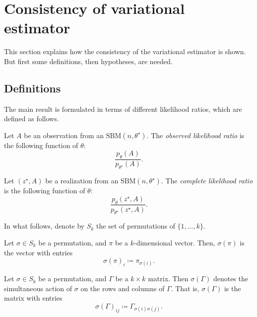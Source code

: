 \documentclass[../../main.tex]{subfiles} %
\begin{document}
\section{Consistency of variational estimator}  %
\label{sec:variational-consistency}
This section explains how the consistency of the variational estimator is shown. 
But first some definitions, then hypotheses, are needed.

\subsection{Definitions}
The main result is formulated in terms of different likelihood 
ratios, which are defined as follows.

\begin{definition}
	Let \(A\) be an observation from an \(\text{SBM}(n, \theta^\star)\). The 
	\textit{observed likelihood ratio} is the following function of \(\theta\):
	\begin{equation}
		\frac{p_\theta (A)}{p_{\theta^\star} (A)}.
	\end{equation}
\end{definition}

\begin{definition}
	Let \((z^\star, A)\) be a realization from an \(\text{SBM}(n, \theta^\star)\). 
	The \textit{complete likelihood ratio} is the following function of \(\theta\):
	\begin{equation}
		\frac{p_\theta (z^\star, 
			A)}{p_{\theta^\star} (z^\star, A)}.
	\end{equation}
\end{definition}

In what follows, denote by \(S_k\) the set of permutations of \(\{1, \dots, k\}\).

\begin{definition}
	Let \(\sigma \in S_k\) be a permutation, and \(\pi\) be a \(k\)-dimensional 
	vector. Then, \(\sigma(\pi)\) is the vector with entries
	\begin{equation}
		\sigma(\pi)_{i} \coloneqq \pi_{\sigma(i)}.
	\end{equation}
\end{definition}

\begin{definition}
	Let \(\sigma \in S_k\) be a permutation, and \(\Gamma\) be a \(k \times k\) 
	matrix. Then \(\sigma(\Gamma)\) denotes the simultaneous action of 
	\(\sigma\) on the rows and columns of \(\Gamma\). That is, 
	\(\sigma(\Gamma)\) is the matrix with entries
	\begin{equation}
		\sigma(\Gamma)_{ij} \coloneqq \Gamma_{\sigma(i) \sigma(j)}.
	\end{equation}
\end{definition}
\end{document}

